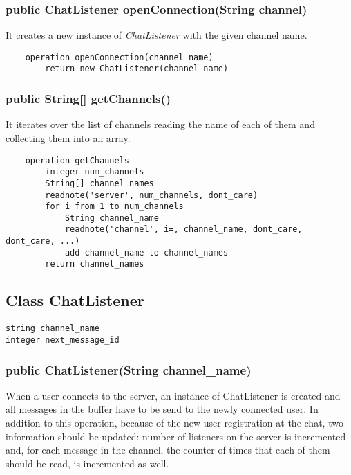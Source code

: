 \documentclass[10pt,a4paper]{article}
\begin{document}
\subsubsection{public ChatListener openConnection(String channel)}
	
It creates a new instance of \textit{ChatListener} with the given channel name.

\begin{verbatim}
	operation openConnection(channel_name)
		return new ChatListener(channel_name)
\end{verbatim}

\subsubsection{public String[] getChannels()}

It iterates over the list of channels reading the name of each of them and collecting them into an array.

\begin{verbatim}
	operation getChannels
		integer num_channels
		String[] channel_names
		readnote('server', num_channels, dont_care)
		for i from 1 to num_channels
			String channel_name
			readnote('channel', i=, channel_name, dont_care, dont_care, ...)
			add channel_name to channel_names
		return channel_names
\end{verbatim}


\subsection{Class ChatListener}

\begin{verbatim}
string channel_name
integer next_message_id
\end{verbatim}

\subsubsection{public ChatListener(String channel_name)}

When a user connects to the server, an instance of ChatListener is created and all messages in the buffer have to be send to the newly connected user. In addition to this operation, because of the new user registration at the chat, two information should be updated: number of listeners on the server is incremented and, for each message in the channel, the counter of times that each of them should be read, is incremented as well.
\end{document}
